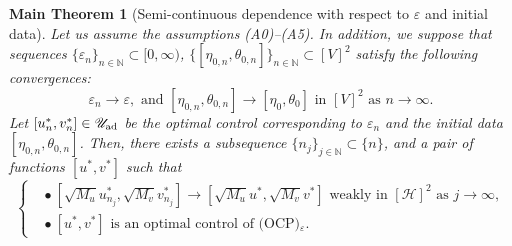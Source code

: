 \documentclass{sinst}
\numberwithin{equation}{section}
\theoremstyle{plain}
\newtheorem{mTh}{Main Theorem}
\theoremstyle{definition}
\def\N{\mathbb{N}}
\def\sH{\mathscr{H}}
\def\sU{\mathscr{U}}
\def\ad{{\rm ad}}
\begin{document}
\begin{mTh}[Semi-continuous dependence with respect to $\varepsilon$ and initial data] \label{mth2}
  Let us assume the assumptions (A0)--(A5). In addition, we suppose that sequences $\{ \varepsilon_n \}_{n \in \N} \subset [0,\infty)$, $\{[\eta_{0,n}, \theta_{0,n}]\}_{n \in \N} \subset [V]^2$ satisfy the following convergences:
  \begin{equation}
    \varepsilon_n \to \varepsilon, \mbox{ and } [\eta_{0,n}, \theta_{0,n}] \to [\eta_0, \theta_0] \mbox{ in } [V]^2 \mbox{ as } n \to \infty.
  \end{equation}
  Let $[u_n^*, v_n^*] \in \sU_\ad$ be the optimal control corresponding to $\varepsilon_n$ and the initial data $[\eta_{0,n}, \theta_{0,n}]$. Then, there exists a subsequence $\{ n_j \}_{j \in \N} \subset \{ n \}$, and a pair of functions $[u^*, v^*]$ such that
  \begin{equation}
    \left\{ \begin{aligned}
      &\bullet \ [\sqrt{M_u} u_{n_j}^*, \sqrt{M_v} v_{n_j}^*] \to [\sqrt{M_u} u^*, \sqrt{M_v} v^*] \mbox{ weakly in } [\sH]^2 \mbox{ as } j \to \infty,
      \\
      &\bullet \ [u^*, v^*] \mbox{ is an optimal control of (OCP)$_\varepsilon$}.
    \end{aligned} \right.
  \end{equation}
\end{mTh}
\end{document}
